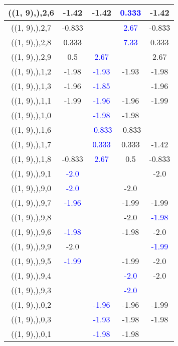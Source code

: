 \documentclass{article}
\begin{document}
\begin{center}
\begin{longtable}{|c|c|c|c|c|}
        	\hline
        	((1, 9),),2,6&-1.42&-1.42& \textcolor{blue}{0.333}&-1.42\\
        	\hline
        	((1, 9),),2,7&-0.833&& \textcolor{blue}{2.67}&-0.833\\
        	\hline
        	((1, 9),),2,8&0.333&& \textcolor{blue}{7.33}&0.333\\
        	\hline
        	((1, 9),),2,9&0.5& \textcolor{blue}{2.67}&&2.67\\
        	\hline
        	((1, 9),),1,2&-1.98& \textcolor{blue}{-1.93}&-1.93&-1.98\\
        	\hline
        	((1, 9),),1,3&-1.96& \textcolor{blue}{-1.85}&&-1.96\\
        	\hline
        	((1, 9),),1,1&-1.99& \textcolor{blue}{-1.96}&-1.96&-1.99\\
        	\hline
        	((1, 9),),1,0&& \textcolor{blue}{-1.98}&-1.98&\\
        	\hline
        	((1, 9),),1,6&& \textcolor{blue}{-0.833}&-0.833&\\
        	\hline
        	((1, 9),),1,7&& \textcolor{blue}{0.333}&0.333&-1.42\\
        	\hline
        	((1, 9),),1,8&-0.833& \textcolor{blue}{2.67}&0.5&-0.833\\
        	\hline
        	((1, 9),),9,1& \textcolor{blue}{-2.0}&&&-2.0\\
        	\hline
        	((1, 9),),9,0& \textcolor{blue}{-2.0}&&-2.0&\\
        	\hline
        	((1, 9),),9,7& \textcolor{blue}{-1.96}&&-1.99&-1.99\\
        	\hline
        	((1, 9),),9,8&&&-2.0& \textcolor{blue}{-1.98}\\
        	\hline
        	((1, 9),),9,6& \textcolor{blue}{-1.98}&&-1.98&-2.0\\
        	\hline
        	((1, 9),),9,9&-2.0&&& \textcolor{blue}{-1.99}\\
        	\hline
        	((1, 9),),9,5& \textcolor{blue}{-1.99}&&-1.99&-2.0\\
        	\hline
        	((1, 9),),9,4&&& \textcolor{blue}{-2.0}&-2.0\\
        	\hline
        	((1, 9),),9,3&&& \textcolor{blue}{-2.0}&\\
        	\hline
        	((1, 9),),0,2&& \textcolor{blue}{-1.96}&-1.96&-1.99\\
        	\hline
        	((1, 9),),0,3&& \textcolor{blue}{-1.93}&-1.98&-1.98\\
        	\hline
        	((1, 9),),0,1&& \textcolor{blue}{-1.98}&-1.98&\\

\end{longtable}
\end{center}
\end{document}
